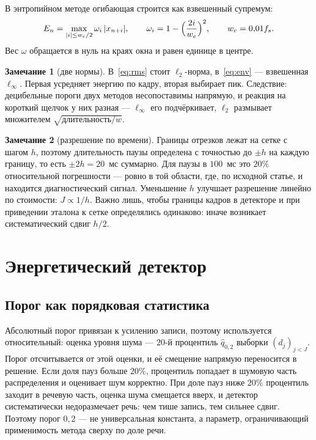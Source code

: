 \documentclass[11pt,a4paper]{article}
\theoremstyle{definition}
\newtheorem{zam}{Замечание}[section]
\theoremstyle{plain}
\begin{document}
В энтропийном методе огибающая строится как взвешенный супремум:
\begin{equation}\label{eq:env}
E_n=\max_{|i|\le w_e/2}\omega_i\,|x_{n+i}|,
\qquad \omega_i=1-\Bigl(\frac{2i}{w_e}\Bigr)^2,
\qquad w_e=0{,}01f_s .
\end{equation}
Вес $\omega$ обращается в нуль на краях окна и равен единице в центре.

\begin{zam}[две нормы]
В~\eqref{eq:rms} стоит $\ell_2$-норма, в~\eqref{eq:env} --- взвешенная
$\ell_\infty$. Первая усредняет энергию по кадру, вторая выбирает пик.
Следствие: децибельные пороги двух методов несопоставимы напрямую, и
реакция на короткий щелчок у них разная --- $\ell_\infty$ его подчёркивает,
$\ell_2$ размывает множителем $\sqrt{\text{длительность}/w}$.
\end{zam}

\begin{zam}[разрешение по времени]\label{zam:resolution}
Границы отрезков лежат на сетке с шагом $h$, поэтому длительность паузы
определена с точностью до $\pm h$ на каждую границу, то есть $\pm 2h=20$~мс
суммарно. Для паузы в $100$~мс это $20\%$ относительной погрешности --- ровно
в той области, где, по исходной статье, и находится диагностический сигнал.
Уменьшение $h$ улучшает разрешение линейно по стоимости: $J\propto 1/h$.
Важно лишь, чтобы границы кадров в детекторе и при приведении эталона к сетке
определялись одинаково: иначе возникает систематический сдвиг $h/2$.
\end{zam}

\section{Энергетический детектор}

\subsection{Порог как порядковая статистика}

Абсолютный порог привязан к усилению записи, поэтому используется
относительный: оценка уровня шума --- $20$-й процентиль $\hat q_{0{,}2}$ выборки
$(d_j)_{j<J}$. Порог отсчитывается от этой оценки, и её смещение напрямую
переносится в решение. Если доля пауз больше $20\%$, процентиль попадает в
шумовую часть распределения и оценивает шум корректно. При доле пауз ниже
$20\%$ процентиль заходит в речевую часть, оценка шума смещается вверх, и
детектор систематически недоразмечает речь: чем тише запись, тем сильнее
сдвиг. Поэтому порог $0{,}2$ --- не универсальная константа, а параметр,
ограничивающий применимость метода сверху по доле речи.
\end{document}
